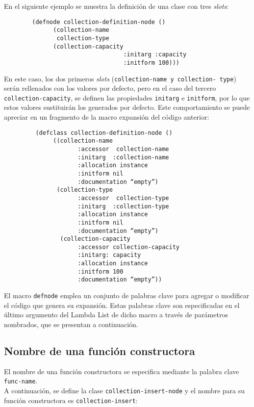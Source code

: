 En el siguiente ejemplo se muestra la definición de una clase con tres  \textit{slots}: 
\begin{verbatim}
        (defnode collection-definition-node () 
	  	      (collection-name
	  	       collection-type 
	  	      (collection-capacity 
	  	                          :initarg :capacity 
	  	                          :initform 100)))
\end{verbatim}

En este caso, los dos primeros \textit{slots} (\texttt{collection-name y collection- type}) serán rellenados con los valores por defecto, pero en el caso del tercero \texttt{collection-capacity},  se definen las propiedades \texttt{initarg} e \texttt{initform}, por lo que estos valores sustituirán los generados por defecto. Este comportamiento se puede apreciar en un fragmento de la macro expansión del código anterior:
\begin{verbatim}
	     (defclass collection-definition-node () 
	          ((collection-name 
	                 :accessor  collection-name
	                 :initarg  :collection-name 
	                 :allocation instance 
	                 :initform nil 
	                 :documentation “empty”)
	           (collection-type 
	                 :accessor  collection-type
	                 :initarg  :collection-type 
	                 :allocation instance 
	                 :initform nil 
	                 :documentation “empty”)
	            (collection-capacity 
	                 :accessor collection-capacity
	                 :initarg: capacity
                     :allocation instance
	                 :initform 100
	                 :documentation “empty”))
\end{verbatim}

El macro \texttt{defnode} emplea un conjunto de palabras clave para agregar o modificar el código que genera su expansión. Estas palabras clave son especificadas en el último argumento del Lambda List de dicho macro a través de parámetros nombrados, que se presentan a continuación.

\subsection{Nombre de una función constructora}
El nombre de una función constructora se especifica mediante la palabra clave \texttt{func-name}.\\ 
A continuación, se define la clase \texttt{collection-insert-node} y el nombre para su función constructora es \texttt{collection-insert}:

